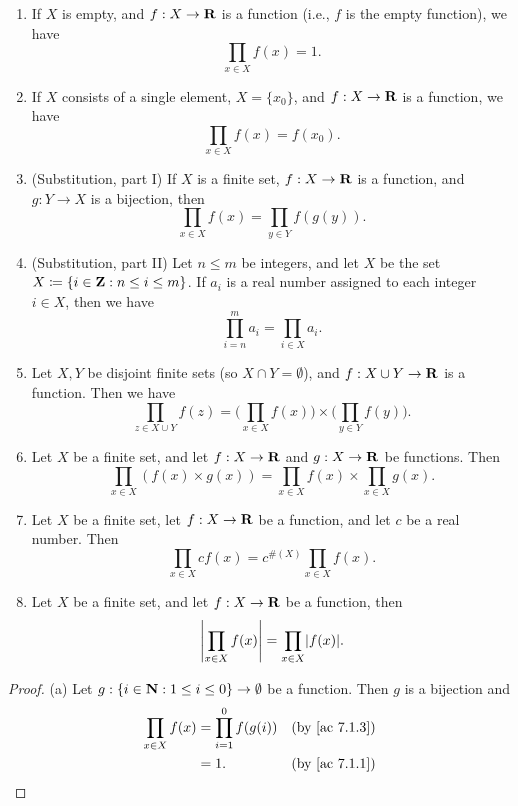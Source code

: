 \begin{additional corollary}\label{ac 7.1.5}
\mbox{}
\begin{enumerate}
  \item If \(X\) is empty, and \(f : X \to \mathbf{R}\) is a function (i.e., \(f\) is the empty function), we have
        \[
          \prod_{x \in X} f(x) = 1.
        \]
  \item If \(X\) consists of a single element, \(X = \{x_0\}\), and \(f : X \to \mathbf{R}\) is a function, we have
        \[
          \prod_{x \in X} f(x) = f(x_0).
        \]
  \item (Substitution, part I) If \(X\) is a finite set, \(f : X \to \mathbf{R}\) is a function, and \(g : Y \to X\) is a bijection, then
        \[
          \prod_{x \in X} f(x) = \prod_{y \in Y} f(g(y)).
        \]
  \item (Substitution, part II) Let \(n \leq m\) be integers, and let \(X\) be the set \(X \coloneqq \{i \in \mathbf{Z} : n \leq i \leq m\}\).
        If \(a_i\) is a real number assigned to each integer \(i \in X\), then we have
        \[
          \prod_{i = n}^m a_i = \prod_{i \in X} a_i.
        \]
  \item Let \(X, Y\) be disjoint finite sets (so \(X \cap Y = \emptyset\)), and \(f : X \cup Y \to \mathbf{R}\) is a function.
        Then we have
        \[
          \prod_{z \in X \cup Y} f(z) = \Bigg(\prod_{x \in X} f(x)\Bigg) \times \Bigg(\prod_{y \in Y} f(y)\Bigg).
        \]
  \item Let \(X\) be a finite set, and let \(f : X \to \mathbf{R}\) and \(g : X \to \mathbf{R}\) be functions.
        Then
        \[
          \prod_{x \in X} (f(x) \times g(x)) = \prod_{x \in X} f(x) \times \prod_{x \in X} g(x).
        \]
  \item Let \(X\) be a finite set, let \(f : X \to \mathbf{R}\) be a function, and let \(c\) be a real number.
        Then
        \[
          \prod_{x \in X} cf(x) = c^{\#(X)} \prod_{x \in X} f(x).
        \]
  \item Let \(X\) be a finite set, and let \(f : X \to \mathbf{R}\) be a function, then
        \[
          \abs{\prod_{x \in X} f(x)} = \prod_{x \in X} \abs{f(x)}.
        \]
\end{enumerate}
\end{additional corollary}

\begin{proof}{(a)}
  Let \(g : \{i \in \mathbf{N} : 1 \leq i \leq 0\} \to \emptyset\) be a function.
  Then \(g\) is a bijection and
  \begin{align*}
    \prod_{x \in X} f(x) & = \prod_{i = 1}^0 f(g(i)) & \text{(by \cref{ac 7.1.3})} \\
                         & = 1.                      & \text{(by \cref{ac 7.1.1})}
  \end{align*}
\end{proof}

